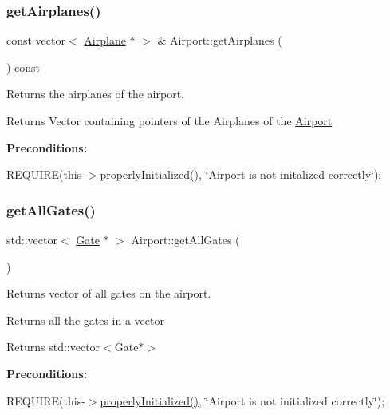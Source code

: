 \subsubsection{\texorpdfstring{get\+Airplanes()}{getAirplanes()}}
{\footnotesize\ttfamily const vector$<$ \mbox{\hyperlink{class_airplane}{Airplane}} $\ast$ $>$ \& Airport\+::get\+Airplanes (\begin{DoxyParamCaption}{ }\end{DoxyParamCaption}) const}



Returns the airplanes of the airport. 

\begin{DoxyReturn}{Returns}
Vector containing pointers of the Airplanes of the \mbox{\hyperlink{class_airport}{Airport}}
\end{DoxyReturn}
{\bfseries Preconditions\+:}
\begin{DoxyItemize}
\item R\+E\+Q\+U\+I\+RE(this-\/$>$\mbox{\hyperlink{class_airport_aa13e68ac58e8875837fbe888325cfff6}{properly\+Initialized()}}, \char`\"{}\+Airport is not initalized correctly\char`\"{}); 
\end{DoxyItemize}\mbox{\label{class_airport_aebd46f12a6e13b077f788b8cc73d57fa}} 
\subsubsection{\texorpdfstring{get\+All\+Gates()}{getAllGates()}}
{\footnotesize\ttfamily std\+::vector$<$ \mbox{\hyperlink{class_gate}{Gate}} $\ast$ $>$ Airport\+::get\+All\+Gates (\begin{DoxyParamCaption}{ }\end{DoxyParamCaption})}



Returns vector of all gates on the airport. 

Returns all the gates in a vector

\begin{DoxyReturn}{Returns}
std\+::vector$<$\+Gate$\ast$$>$
\end{DoxyReturn}
{\bfseries Preconditions\+:}
\begin{DoxyItemize}
\item R\+E\+Q\+U\+I\+RE(this-\/$>$\mbox{\hyperlink{class_airport_aa13e68ac58e8875837fbe888325cfff6}{properly\+Initialized()}}, \char`\"{}\+Airport is not initialized correctly\char`\"{}); 
\end{DoxyItemize}\mbox{\label{class_airport_a7fd582a5f9554830247f724ddc031d84}} 
